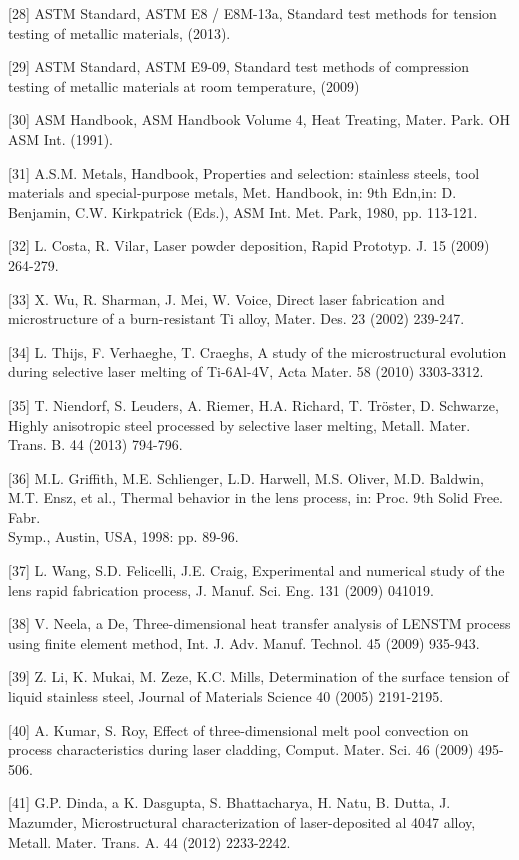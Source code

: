 \documentclass[10pt]{article}
\begin{document}
[28] ASTM Standard, ASTM E8 / E8M-13a, Standard test methods for tension testing of metallic materials, (2013).

[29] ASTM Standard, ASTM E9-09, Standard test methods of compression testing of metallic materials at room temperature, (2009)

[30] ASM Handbook, ASM Handbook Volume 4, Heat Treating, Mater. Park. OH ASM Int. (1991).

[31] A.S.M. Metals, Handbook, Properties and selection: stainless steels, tool materials and special-purpose metals, Met. Handbook, in: 9th Edn,in: D. Benjamin, C.W. Kirkpatrick (Eds.), ASM Int. Met. Park, 1980, pp. 113-121.

[32] L. Costa, R. Vilar, Laser powder deposition, Rapid Prototyp. J. 15 (2009) 264-279.

[33] X. Wu, R. Sharman, J. Mei, W. Voice, Direct laser fabrication and microstructure of a burn-resistant Ti alloy, Mater. Des. 23 (2002) 239-247.

[34] L. Thijs, F. Verhaeghe, T. Craeghs, A study of the microstructural evolution during selective laser melting of Ti-6Al-4V, Acta Mater. 58 (2010) 3303-3312.

[35] T. Niendorf, S. Leuders, A. Riemer, H.A. Richard, T. Tröster, D. Schwarze, Highly anisotropic steel processed by selective laser melting, Metall. Mater. Trans. B. 44 (2013) 794-796.

[36] M.L. Griffith, M.E. Schlienger, L.D. Harwell, M.S. Oliver, M.D. Baldwin, M.T. Ensz, et al., Thermal behavior in the lens process, in: Proc. 9th Solid Free. Fabr.\\
Symp., Austin, USA, 1998: pp. 89-96.

[37] L. Wang, S.D. Felicelli, J.E. Craig, Experimental and numerical study of the lens rapid fabrication process, J. Manuf. Sci. Eng. 131 (2009) 041019.

[38] V. Neela, a De, Three-dimensional heat transfer analysis of LENSTM process using finite element method, Int. J. Adv. Manuf. Technol. 45 (2009) 935-943.

[39] Z. Li, K. Mukai, M. Zeze, K.C. Mills, Determination of the surface tension of liquid stainless steel, Journal of Materials Science 40 (2005) 2191-2195.

[40] A. Kumar, S. Roy, Effect of three-dimensional melt pool convection on process characteristics during laser cladding, Comput. Mater. Sci. 46 (2009) 495-506.

[41] G.P. Dinda, a K. Dasgupta, S. Bhattacharya, H. Natu, B. Dutta, J. Mazumder, Microstructural characterization of laser-deposited al 4047 alloy, Metall. Mater. Trans. A. 44 (2012) 2233-2242.
\end{document}
